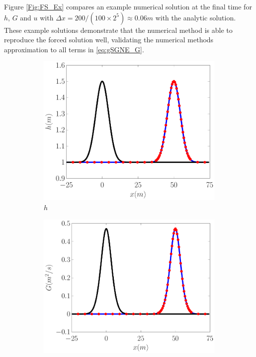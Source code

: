 \documentclass[10pt]{elsarticle}
\begin{document}
Figure \ref{Fig:FS_Ex} compares an example numerical solution at the final time for $h$, $G$ and $u$ with $\Delta x = 200 / (100 \times 2^{5}) \approx 0.06m$ with the analytic solution. These example solutions demonstrate that the numerical method is able to reproduce the forced solution well, validating the numerical methods approximation to all terms in \eqref{eq:gSGNE_G}. 
%
\begin{figure}
	\centering
	\begin{subfigure}{0.32\textwidth}
		\centering
		\includegraphics[width=\textwidth]{Figure-9a.pdf}
		\caption{$h$}
	\end{subfigure}
	\begin{subfigure}{0.32\textwidth}
		\centering
		\includegraphics[width=\textwidth]{Figure-9b.pdf}

\end{subfigure}
\end{figure}
\end{document}
